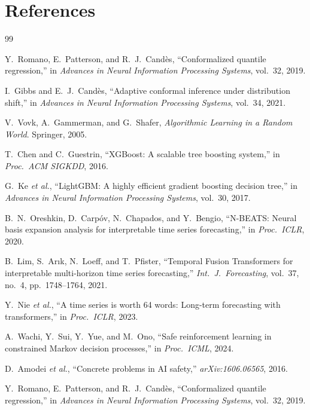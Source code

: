 \chapter*{References}

\begin{thebibliography}{99}

Y.~Romano, E.~Patterson, and R.~J.~Candès,
``Conformalized quantile regression,''
in \emph{Advances in Neural Information Processing Systems}, vol.~32, 2019.

I.~Gibbs and E.~J.~Candès,
``Adaptive conformal inference under distribution shift,''
in \emph{Advances in Neural Information Processing Systems}, vol.~34, 2021.

V.~Vovk, A.~Gammerman, and G.~Shafer,
\emph{Algorithmic Learning in a Random World}.
Springer, 2005.

T.~Chen and C.~Guestrin,
``XGBoost: A scalable tree boosting system,''
in \emph{Proc.\ ACM SIGKDD}, 2016.

G.~Ke \emph{et al.},
``LightGBM: A highly efficient gradient boosting decision tree,''
in \emph{Advances in Neural Information Processing Systems}, vol.~30, 2017.

B.~N.~Oreshkin, D.~Carp\'{o}v, N.~Chapados, and Y.~Bengio,
``N-BEATS: Neural basis expansion analysis for interpretable time series forecasting,''
in \emph{Proc.\ ICLR}, 2020.

B.~Lim, S.~Ar{\i}k, N.~Loeff, and T.~Pfister,
``Temporal Fusion Transformers for interpretable multi-horizon time series forecasting,''
\emph{Int.\ J.\ Forecasting}, vol.~37, no.~4, pp.~1748--1764, 2021.

Y.~Nie \emph{et al.},
``A time series is worth 64 words: Long-term forecasting with transformers,''
in \emph{Proc.\ ICLR}, 2023.

A.~Wachi, Y.~Sui, Y.~Yue, and M.~Ono,
``Safe reinforcement learning in constrained Markov decision processes,''
in \emph{Proc.\ ICML}, 2024.

D.~Amodei \emph{et al.},
``Concrete problems in AI safety,''
\emph{arXiv:1606.06565}, 2016.

Y.~Romano, E.~Patterson, and R.~J.~Candès,
``Conformalized quantile regression,''
in \emph{Advances in Neural Information Processing Systems}, vol.~32, 2019.


\end{thebibliography}
